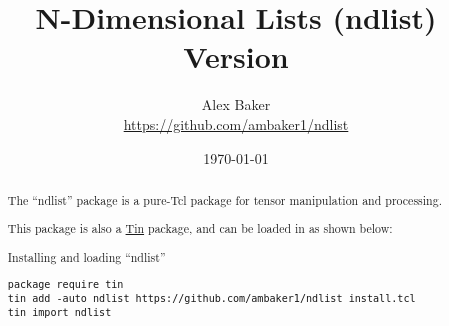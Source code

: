 \documentclass{article}
\title{\Huge{N-Dimensional Lists (ndlist)}\\\large Version \version}
\author{Alex Baker\\\small\url{https://github.com/ambaker1/ndlist}}
\date{\small\today}
\begin{document}
\maketitle
\begin{abstract}
\begin{center}
The ``ndlist'' package is a pure-Tcl package for tensor manipulation and processing.

This package is also a \textcolor{blue}{\href{https://github.com/ambaker1/Tin}{Tin}} package, and can be loaded in as shown below:
\end{center}
\begin{example}{Installing and loading ``ndlist''}
\begin{lstlisting}
package require tin
tin add -auto ndlist https://github.com/ambaker1/ndlist install.tcl
tin import ndlist
\end{lstlisting}
\end{example}
\end{abstract}
\clearpage








\small{\printindex}
\end{document}
